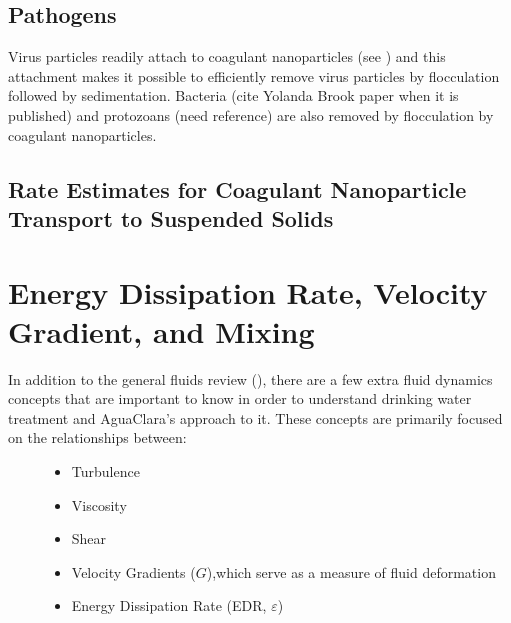 \documentclass[letterpaper,10pt,english]{sphinxmanual}
\begin{document}
\subsection{Pathogens}
\label{\detokenize{Rapid_Mix/RM_Intro:pathogens}}\label{\detokenize{Rapid_Mix/RM_Intro:heading-pathogens-and-coagulant}}
Virus particles readily attach to coagulant nanoparticles (see ) and this attachment makes it possible to efficiently remove virus particles by flocculation followed by sedimentation. Bacteria (cite Yolanda Brook paper when it is published) and protozoans (need reference) are also removed by flocculation by coagulant nanoparticles.


\subsection{Rate Estimates for Coagulant Nanoparticle Transport to Suspended Solids}
\label{\detokenize{Rapid_Mix/RM_Intro:rate-estimates-for-coagulant-nanoparticle-transport-to-suspended-solids}}\label{\detokenize{Rapid_Mix/RM_Intro:heading-rate-estimates-for-coagulant-nanoparticle-transport-to-suspended-solids}}

\section{Energy Dissipation Rate, Velocity Gradient, and Mixing}
\label{\detokenize{Rapid_Mix/RM_Intro:energy-dissipation-rate-velocity-gradient-and-mixing}}\label{\detokenize{Rapid_Mix/RM_Intro:heading-edr-g-and-mixing}}\begin{description}
\item[{In addition to the general fluids review ({\hyperref[\detokenize{Review/Review_Fluid_Mechanics:title-review-fluid-mechanics}]{}}), there are a few extra fluid dynamics concepts that are important to know in order to understand drinking water treatment and AguaClara’s approach to it. These concepts are primarily focused on the relationships between:}] \leavevmode\begin{itemize}
\item {} 
Turbulence

\item {} 
Viscosity

\item {} 
Shear

\item {} 
Velocity Gradients (\(G\)),which serve as a measure of fluid deformation

\item {} 
Energy Dissipation Rate (EDR, \(\varepsilon\))

\end{itemize}

\end{description}
\end{document}
